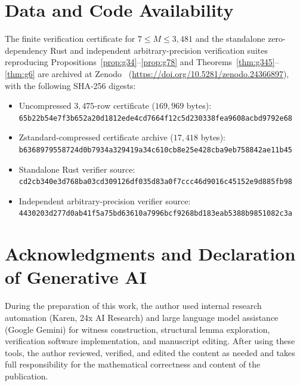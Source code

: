\documentclass[11pt]{article}
\begin{document}
\section*{Data and Code Availability}

The finite verification certificate for $7 \le M \le 3{,}481$ and the standalone zero-dependency Rust and independent arbitrary-precision verification suites reproducing Propositions~\ref{prop:g34}--\ref{prop:g78} and Theorems~\ref{thm:g345}--\ref{thm:g6} are archived at Zenodo~\cite{bergstrom26smallcode} (\url{https://doi.org/10.5281/zenodo.24366897}), with the following SHA-256 digests:
\begin{itemize}
\item Uncompressed $3{,}475$-row certificate ($169{,}969$ bytes): {\small \texttt{65b22b54e7f3b652a20d1812ede4cd7664f12c5d230338fea9608acbd9792e68}}
\item Zstandard-compressed certificate archive ($17{,}418$ bytes): {\small \texttt{b6368979558724d0b7934a329419a34c610cb8e25e428cba9eb758842ae11b45}}
\item Standalone Rust verifier source: {\small \texttt{cd2cb340e3d768ba03cd309126df035d83a0f7ccc46d9016c45152e9d885fb98}}
\item Independent arbitrary-precision verifier source: {\small \texttt{4430203d277d0ab41f5a75bd63610a7996bcf9268bd183eab5388b9851082c3a}}
\end{itemize}

\section*{Acknowledgments and Declaration of Generative AI}

During the preparation of this work, the author used internal research automation (Karen, 24x AI Research) and large language model assistance (Google Gemini) for witness construction, structural lemma exploration, verification software implementation, and manuscript editing. After using these tools, the author reviewed, verified, and edited the content as needed and takes full responsibility for the mathematical correctness and content of the publication.



\end{document}
